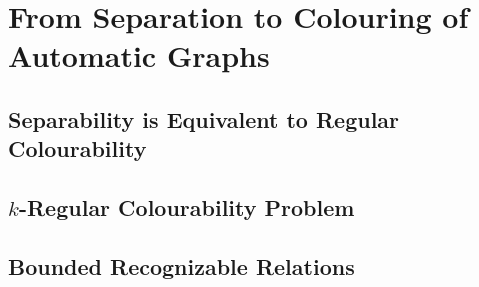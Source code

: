 \section{%
	\AP\label{sec:dichotomy-colouring}%
	From Separation to Colouring of Automatic Graphs
}

\subsection{Separability is Equivalent to Regular Colourability}

\subsection{$k$-Regular Colourability Problem}

\subsection{Bounded Recognizable Relations}